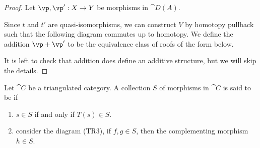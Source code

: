 \begin{proof}
    Let $\vp,\vp':X\to Y$ be morphisms in $\cat{D(A)}$. 
    \begin{center}
        \hspace{2.5cm}
    \end{center}
    Since $t$ and $t'$ are quasi-isomorphisms, we can construct $V$ by homotopy pullback such that the following diagram commutes up to homotopy. We define the addition $\vp+\vp'$ to be the equivalence class of roofs of the form below.
    \begin{center}
        \hspace{2.5cm}
    \end{center}
    It is left to check that addition does define an additive structure, but we will skip the details.
\end{proof}
\begin{definition}
    Let $\cat{C}$ be a triangulated category. A collection $S$ of morphisms in $\cat{C}$ is said to be  if 
    \begin{enumerate}
        \item $s\in S$ if and only if $T(s)\in S$.
        \item consider the diagram (TR3), if $f,g\in S$, then the complementing morphism $h\in S$.
    \end{enumerate}
\end{definition}
